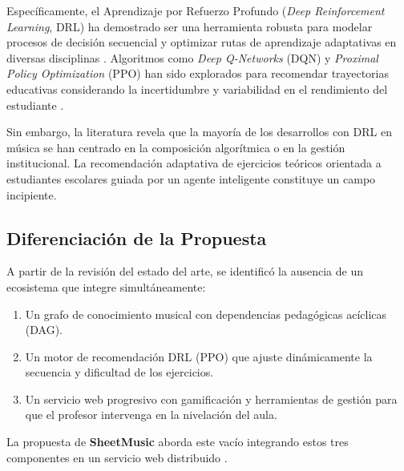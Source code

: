 Específicamente, el Aprendizaje por Refuerzo Profundo (\textit{Deep Reinforcement Learning}, DRL) ha demostrado ser una herramienta robusta para modelar procesos de decisión secuencial y optimizar rutas de aprendizaje adaptativas en diversas disciplinas \cite{alrowais2025, li2025}. Algoritmos como \textit{Deep Q-Networks} (DQN) y \textit{Proximal Policy Optimization} (PPO) han sido explorados para recomendar trayectorias educativas considerando la incertidumbre y variabilidad en el rendimiento del estudiante \cite{garcia2025}. 

Sin embargo, la literatura revela que la mayoría de los desarrollos con DRL en música se han centrado en la composición algorítmica o en la gestión institucional. La recomendación adaptativa de ejercicios teóricos orientada a estudiantes escolares guiada por un agente inteligente constituye un campo incipiente.

\subsection{Diferenciación de la Propuesta}
A partir de la revisión del estado del arte, se identificó la ausencia de un ecosistema que integre simultáneamente:
\begin{enumerate}
    \item Un grafo de conocimiento musical con dependencias pedagógicas acíclicas (DAG).
    \item Un motor de recomendación DRL (PPO) que ajuste dinámicamente la secuencia y dificultad de los ejercicios.
    \item Un servicio web progresivo con gamificación y herramientas de gestión para que el profesor intervenga en la nivelación del aula.
\end{enumerate}

La propuesta de \textbf{SheetMusic} aborda este vacío integrando estos tres componentes en un servicio web distribuido \cite{inzulza2026, alves2026}.